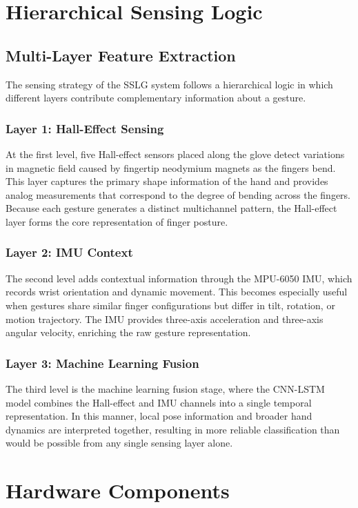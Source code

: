 \documentclass[12pt,a4paper]{report}
\begin{document}
\section{Hierarchical Sensing Logic}
\label{sec:method_sensing}

\subsection{Multi-Layer Feature Extraction}
The sensing strategy of the SSLG system follows a hierarchical logic in which different layers contribute complementary information about a gesture. 

\subsubsection{Layer 1: Hall-Effect Sensing}
At the first level, five Hall-effect sensors placed along the glove detect variations in magnetic field caused by fingertip neodymium magnets as the fingers bend. This layer captures the primary shape information of the hand and provides analog measurements that correspond to the degree of bending across the fingers. Because each gesture generates a distinct multichannel pattern, the Hall-effect layer forms the core representation of finger posture.

\subsubsection{Layer 2: IMU Context}
The second level adds contextual information through the MPU-6050 IMU, which records wrist orientation and dynamic movement. This becomes especially useful when gestures share similar finger configurations but differ in tilt, rotation, or motion trajectory. The IMU provides three-axis acceleration and three-axis angular velocity, enriching the raw gesture representation.

\subsubsection{Layer 3: Machine Learning Fusion}
The third level is the machine learning fusion stage, where the CNN-LSTM model combines the Hall-effect and IMU channels into a single temporal representation. In this manner, local pose information and broader hand dynamics are interpreted together, resulting in more reliable classification than would be possible from any single sensing layer alone.

\section{Hardware Components}
\label{sec:method_hardware}
\end{document}
